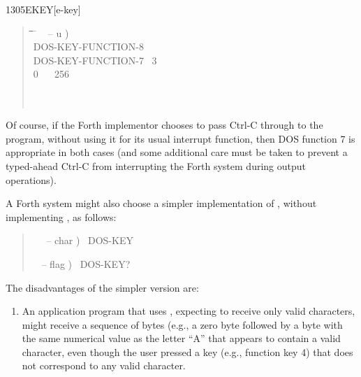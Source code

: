 \begin{newword}{1305}{EKEY}[e-key]
\begin{rationale}
		\begin{quote}
			\ttfamily
			\begin{tabbing}
			\tab \= \tab \= \tab \= \tab \= \hspace{7em} \= \kill
			\+ \word{:} ~  -- u ) \\
				\+ DOS-KEY-FUNCTION-8~ ~ ~  \\
					DOS-KEY-FUNCTION-7~  3~ \word{=}~  \\
					\>  0~ ~ 256 \word{+}\\
				\- \word{THEN} \\
			\-  \\
			\word{;}
			\end{tabbing}
		\end{quote}

		Of course, if the Forth implementor chooses to pass Ctrl-C
		through to the program, without using it for its usual
		interrupt function, then DOS function 7 is appropriate in both
		cases (and some additional care must be taken to prevent a
		typed-ahead Ctrl-C from interrupting the Forth system during
		output operations).

		A Forth system might also choose a simpler implementation of
		, without implementing , as follows:

		\begin{quote}\ttfamily
			\word{:} ~~  -- char )~
				DOS-KEY~
			\word{;}

			\word{:} ~  -- flag )~
				DOS-KEY?~ ~
			\word{;}
		\end{quote}

		The disadvantages of the simpler version are:

		\begin{enumerate}
		\item An application program that uses ,
			expecting to receive only valid characters, might receive a
			sequence of bytes (e.g., a zero byte followed by a byte with
			the same numerical value as the letter ``A'' that appears to
			contain a valid character, even though the user pressed a key
			(e.g., function key 4) that does not correspond to any valid
			character.


\end{enumerate}
\end{rationale}
\end{newword}
